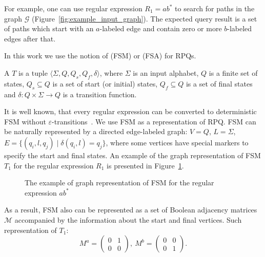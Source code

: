 For example, one can use regular expression $R_1 = ab^*$ to search for paths in the graph $\mathcal{G}$ (Figure~\ref{fig:example_input_graph}).
The expected query result is a set of paths which start with an $a$-labeled edge and contain zero or more $b$-labeled edges after that.

In this work we use the notion of  (FSM) or  (FSA) for RPQs.

\begin{definition}
A  $T$ is a tuple $\langle \Sigma, Q, Q_s, Q_f, \delta \rangle$, where $\Sigma$ is an input alphabet, $Q$ is a finite set of states, $Q_s \subseteq Q$ is a set of start (or initial) states, $Q_f \subseteq Q$ is a set of final states and $\delta: Q \times \Sigma \to Q$ is a transition function.
\end{definition}

It is well known, that every regular expression can be converted to deterministic FSM without $\varepsilon$-transitions~\cite{automata:theory:10.5555/1177300}.
We use FSM as a representation of RPQ.
FSM can be naturally represented by a directed edge-labeled graph: $V = Q$, $L = \Sigma$, $E = \{(q_i,l,q_j) \mid \delta(q_i,l) = q_j\}$, where some vertices have special markers to specify the start and final states.
An example of the graph representation of FSM $T_1$ for the regular expression $R_1$ is presented in Figure~\ref{fig:example_fsm}.

\begin{figure}[h]
    \centering
    \caption{The example of graph representation of FSM for the regular expression $ab^*$}
    \label{fig:example_fsm}
\end{figure}

As a result, FSM also can be represented as a set of Boolean adjacency matrices $\mathcal{M}$ accompanied by the information about the start and final vertices.
Such representation of $T_1$:
$$
M^a =
\begin{pmatrix}
0&1 \\
0&0
\end{pmatrix},~
M^b =
\begin{pmatrix}
0&0 \\
0&1
\end{pmatrix}.
$$


